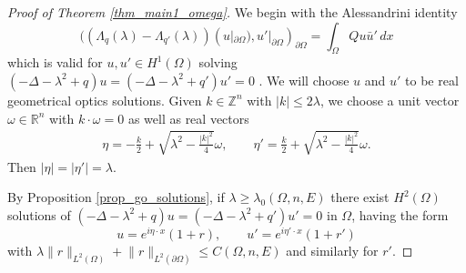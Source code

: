 \documentclass[a4paper, 11pt, twoside, notitlepage]{amsart}
\theoremstyle{definition}
\theoremstyle{remark}
\newcommand{\R}{{\mathbb R}}
\newcommand {\p} {\partial}
\newcommand{\norm}[1]{\lVert #1 \rVert}
\begin{document}
\begin{proof}[Proof of Theorem \ref{thm_main1_omega}]
We begin with the Alessandrini identity 
\begin{equation} \label{bandlimited_alessandrini}
( (\Lambda_q(\lambda)-\Lambda_{q'}(\lambda)) (u|_{\p \Omega}), u'|_{\p \Omega})_{\p \Omega} = \int_{\Omega} Q u \bar{u}' \,dx
\end{equation}
which is valid for $u, u' \in H^1(\Omega)$ solving $(-\Delta-\lambda^2+q)u = (-\Delta-\lambda^2+q')u' = 0$ \cite{feldman_calderproblem_nodate}. We will choose $u$ and $u'$ to be real geometrical optics solutions. Given $k \in \mathbb{Z}^n$ with $|k| \leq 2 \lambda$, we choose a unit vector $\omega \in \R^n$ with $k \cdot \omega = 0$ as well as real vectors 
\begin{align*}
    \eta = -\frac{k}{2} + \sqrt{\lambda^2-\frac{|k|^2}{4}}\omega, \qquad \eta' = \frac{k}{2} + \sqrt{\lambda^2-\frac{|k|^2}{4}}\omega.
\end{align*}
Then $|\eta| = |\eta'| = \lambda$.

By Proposition \ref{prop_go_solutions}, if $\lambda \geq \lambda_0(\Omega,n,E)$ there exist $H^2(\Omega)$ solutions of $(-\Delta-\lambda^2+q)u = (-\Delta - \lambda^2 + q')u' = 0$ in $\Omega$, having the form 
\[
u = e^{i \eta \cdot x}(1+r), \qquad u' = e^{i \eta' \cdot x}(1+r')
\]
with $\lambda \norm{r}_{L^2(\Omega)} + \norm{r}_{L^2(\p \Omega)} \leq C(\Omega,n,E)$ and similarly for $r'$.


\end{proof}
\end{document}
